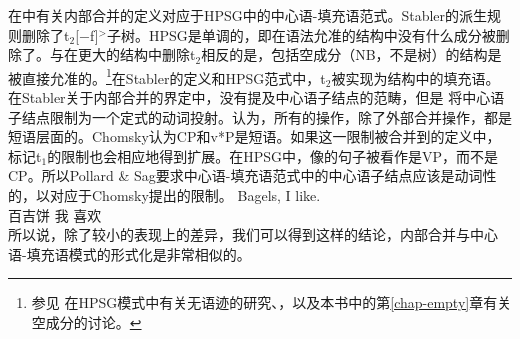 在中有关内部合并的定义对应于HPSG中的中心语-填充语范式\citep[]{ps2}。Stabler的派生规则删除了t$_2$[$-$f]$^>$子树。HPSG是单调的，即在语法允准的结构中没有什么成分被删除了。与在更大的结构中删除t$_2$相反的是，包括空成分（NB，不是树）的结构是被直接允准的。\footnote{%
参见 在HPSG模式中有关无语迹的研究、，以及本书中的第\ref{chap-empty}章有关空成分的讨论。
}在Stabler的定义和HPSG范式中，t$_2$被实现为结构中的填充语。在Stabler关于内部合并的界定中，没有提及中心语子结点的范畴，但是 \citet[]{ps2}将中心语子结点限制为一个定式的动词投射。\citet[]{Chomsky2007a}认为，所有的操作，除了外部合并操作，都是短语层面的。Chomsky认为CP和v*P是短语。如果这一限制被合并到的定义中，标记t$_1$的限制也会相应地得到扩展。在HPSG中，像的句子被看作是VP，而不是CP。所以Pollard \& Sag要求中心语-填充语范式中的中心语子结点应该是动词性的，以对应于Chomsky提出的限制。
\ea
\gll Bagels, I like.\\
百吉饼 我 喜欢\\
\z
所以说，除了较小的表现上的差异，我们可以得到这样的结论，内部合并与中心语-填充语模式的形式化是非常相似的。

